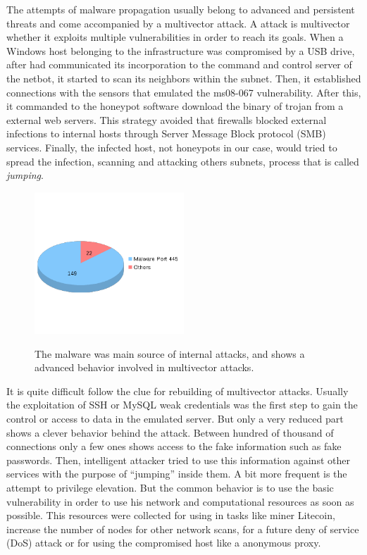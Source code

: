 \documentclass[a4paper]{llncs}
\begin{document}
The attempts of malware propagation usually belong to advanced and persistent threats and come accompanied by a multivector attack. A attack is multivector whether it exploits multiple vulnerabilities in order to reach its goals. When a Windows host belonging to the infrastructure was compromised by a USB drive, after had communicated its incorporation to the command and control server of the netbot, it started to scan its neighbors within the subnet. Then, it established connections with the sensors that  emulated the ms08-067\cite{ms08067} vulnerability. After this, it commanded to the honeypot software download the binary of trojan from a external web servers. This strategy avoided that firewalls blocked external infections to internal hosts through Server Message Block protocol (SMB) services. Finally, the infected host, not honeypots in our case, would tried to spread the infection, scanning and attacking others subnets, process that is called {\it jumping}.

\begin{figure}[h]
	\includegraphics[width=0.5\textwidth]{internalTypes.png}
	\centering
	\label{fig:internalTypes}
	\caption{The malware was main source of internal attacks, and shows a advanced behavior involved in multivector attacks.}
\end{figure}

It is quite difficult follow the clue for rebuilding of multivector attacks. Usually the exploitation of SSH or MySQL weak credentials was the first step to gain the control or access to data in the emulated server. But only a very reduced part shows a clever behavior behind the attack. Between hundred of thousand of connections only a few ones shows access to the fake information such as fake passwords. Then, intelligent attacker tried to use this information against other services with the purpose of  ``jumping'' inside them. A bit more frequent is the attempt to privilege elevation. But the common behavior is to use the basic vulnerability in order to use his network and computational resources as soon as possible. This resources were collected for using in tasks like miner Litecoin\cite{litecoin}, increase the number of nodes for other network scans, for a future deny of service (DoS) attack or for using the compromised host like a anonymous proxy.
\end{document}
